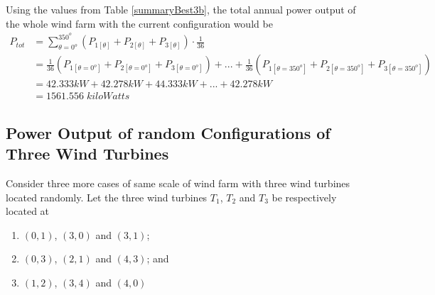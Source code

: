 	Using the values from Table \ref{summaryBest3b}, the total annual power output of the whole wind farm with the current configuration would be
    \begin{align*}
        P_{tot}
        &= \sum_{\theta=0^o}^{350^o} \left( P_{1[\theta]} + P_{2[\theta]} + P_{3[\theta]} \right) \cdot \frac{1}{36} \\
        &= \frac{1}{36}\left( P_{1[\theta=0^o]} + P_{2[\theta=0^o]} + P_{3[\theta=0^o]} \right) +...+ \frac{1}{36}\left( P_{1[\theta=350^o]} + P_{2[\theta=350^o]} + P_{3[\theta=350^o]} \right) \\
        &= 42.333kW + 42.278kW + 44.333kW +...+ 42.278kW \\
        &= 1561.556\;kiloWatts
    \end{align*}
	
\subsection{Power Output of random Configurations of Three Wind Turbines}
    Consider three more cases of same scale of wind farm with three wind turbines located randomly. Let the three wind turbines $T_1$, $T_2$ and $T_3$ be respectively located at
    \begin{enumerate}
        \item $(0,1)$, $(3,0)$ and $(3,1)$;
        \item $(0,3)$, $(2,1)$ and $(4,3)$; and
        \item $(1,2)$, $(3,4)$ and $(4,0)$
    \end{enumerate}
    
    \newcommand{\subscript}[2]{$#1 _ #2$}
    
